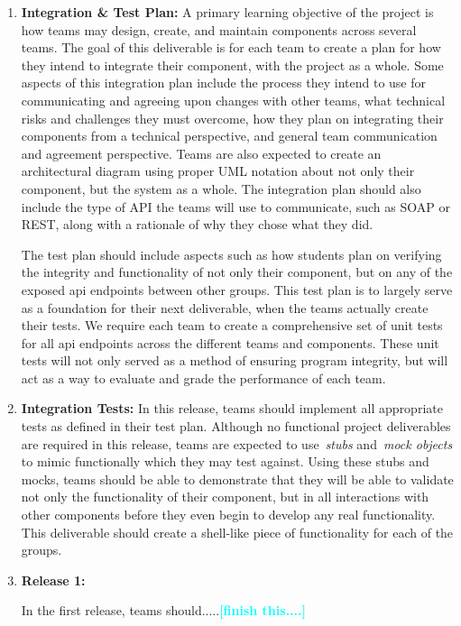 \documentclass{sig-alternate-05-2015}
\newcommand{\todo}[1]{\textcolor{cyan}{\textbf{[#1]}}}
\begin{document}
\begin{enumerate}
	
	\item \textbf{Integration \& Test Plan:} A primary learning objective of the project is how teams may design, create, and maintain components across several teams. The goal of this deliverable is for each team to create a plan for how they intend to integrate their component, with the project as a whole. Some aspects of this integration plan include the process they intend to use for communicating and agreeing upon changes with other teams, what technical risks and challenges they must overcome, how they plan on integrating their components from a technical perspective, and general team communication and agreement perspective. Teams are also expected to create an architectural diagram using proper UML notation about not only their component, but the system as a whole. The integration plan should also include the type of API the teams will use to communicate, such as SOAP or REST, along with a rationale of why they chose what they did.

The test plan should include aspects such as how students plan on verifying the integrity and functionality of not only their component, but on any of the exposed api endpoints between other groups. This test plan is to largely serve as a foundation for their next deliverable, when the teams actually create their tests. We require each team to create a comprehensive set of unit tests for all api endpoints across the different teams and components. These unit tests will not only served as a method of ensuring program integrity, but will act as a way to evaluate and grade the performance of each team. 
	
	
	
	\item \textbf{Integration Tests:} In this release, teams should implement all appropriate tests as defined in their test plan. Although no functional project deliverables are required in this release, teams are expected to use~\emph{stubs} and~\emph{mock objects} to mimic functionally which they may test against. Using these stubs and mocks, teams should be able to demonstrate that they will be able to validate not only the functionality of their component, but in all interactions with other components before they even begin to develop any real functionality. This deliverable should create a shell-like piece of functionality for each of the groups. 
		
	
	\item \textbf{Release 1:} 
	
	In the first release, teams should.....\todo{finish this....}
	

\end{enumerate}
\end{document}
